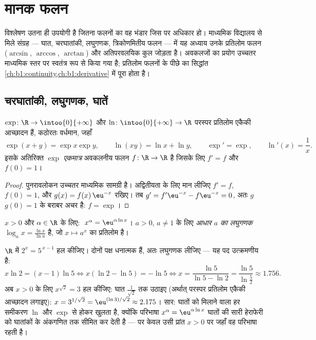 \chapter{मानक फलन}\label{ch:b1:functions}

विश्लेषण उतना ही उपयोगी है जितना फलनों का वह भंडार जिस पर अधिकार हो।
माध्यमिक विद्यालय से मिले संग्रह --- घात, चरघातांकी, लघुगणक, त्रिकोणमितीय
फलन --- में यह अध्याय उनके प्रतिलोम फलन ($\arcsin$, $\arccos$, $\arctan$) और
अतिपरवलयिक कुल जोड़ता है। अवकलजों का प्रयोग उच्चतर माध्यमिक स्तर पर स्वतंत्र
रूप से किया गया है; प्रतिलोम फलनों के पीछे का सिद्धांत
\cref{ch:b1:continuity,ch:b1:derivative} में पूरा होता है।

\section{चरघातांकी, लघुगणक, घातें}

\begin{proposition}[पुनरावलोकन और अभिलक्षण]\label{prop:b1:functions:expln}
$\exp \colon \R \to \intoo{0}{+\infty}$ और $\ln \colon \intoo{0}{+\infty}
\to \R$ परस्पर प्रतिलोम एकैकी आच्छादन हैं, कठोरतः वर्धमान, जहाँ
\[
\exp(x + y) = \exp x \exp y, \qquad \ln(xy) = \ln x + \ln y,
\qquad \exp' = \exp, \qquad \ln'(x) = \frac 1x .
\]
इसके अतिरिक्त $\exp$ \emph{एकमात्र} अवकलनीय फलन $f \colon \R \to \R$ है
जिसके लिए $f' = f$ और $f(0) = 1$।
\end{proposition}

\begin{proof}
पुनरावलोकन उच्चतर माध्यमिक सामग्री है। अद्वितीयता के लिए मान लीजिए $f' = f$,
$f(0) = 1$, और $g(x) = f(x)\,\eu^{-x}$ रखिए। तब $g' = f'\eu^{-x} - f\eu^{-x}
= 0$, अतः $g$ $g(0) = 1$ के बराबर अचर है: $f = \exp$।
\end{proof}

\begin{definition}[व्यापक घातें]\label{def:b1:functions:powers}
$x > 0$ और $\alpha \in \R$ के लिए: $\;x^\alpha = \eu^{\alpha \ln
x}$। $a > 0$, $a \neq 1$ के लिए \emph{आधार $a$ का लघुगणक}
$\log_a x = \frac{\ln x}{\ln a}$ है, जो $x \mapsto a^x$ का प्रतिलोम है।
\end{definition}

\begin{example}\label{ex:b1:functions:expequations}
$\R$ में $2^x = 5^{\,x-1}$ हल कीजिए। दोनों पक्ष धनात्मक हैं, अतः लघुगणक
लीजिए --- यह पद उत्क्रमणीय है:
\[
x\ln2 = (x - 1)\ln5
\iff x(\ln2 - \ln5) = -\ln5
\iff x = \frac{\ln5}{\ln5 - \ln2} = \frac{\ln 5}{\ln\frac52}
\approx 1.756 .
\]
अब $x > 0$ के लिए $x^{\sqrt2} = 3$ हल कीजिए: घात $\frac1{\sqrt2}$ तक उठाइए
(अर्थात् परस्पर प्रतिलोम एकैकी आच्छादन लगाइए): $x = 3^{1/\sqrt2} = \eu^{(\ln
3)/\sqrt2} \approx 2.175$। सार: घातों को मिलाने वाला हर समीकरण $\ln$ और
$\exp$ से होकर खुलता है, क्योंकि परिभाषा $x^\alpha = \eu^{\alpha\ln x}$
घातों की सारी हेराफेरी को घातांकों के अंकगणित तक सीमित कर देती है --- पर
केवल उसी प्रांत $x > 0$ पर जहाँ वह परिभाषा रहती है।
\end{example}

